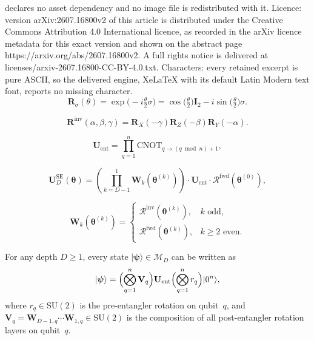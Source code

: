 \documentclass[10pt,a4paper]{amsart}
\newcommand{\CNOT}{\mathrm{CNOT}}
\newcommand{\SU}{\mathrm{SU}}
\newcommand{\cM}{\mathcal{M}}
\begin{document}
declares no asset dependency and no image file is redistributed with it. Licence: version arXiv:2607.16800v2 of this article is distributed under the Creative Commons Attribution 4.0 International licence, as recorded in the arXiv licence metadata for this exact version and shown on the abstract page https://arxiv.org/abs/2607.16800v2. A full rights notice is delivered at licenses/arxiv-2607.16800-CC-BY-4.0.txt. Characters: every retained excerpt is pure ASCII, so the delivered engine, XeLaTeX with its default Latin Modern text font, reports no missing character.
\begin{equation}\label{eq:pauli_rot}
  \mathbf{R}_{\sigma}(\theta)
  = \exp \bigl(-i\tfrac{\theta}{2}\sigma\bigr)
  = \cos \bigl(\tfrac{\theta}{2}\bigr) \mathbf{I}_2
    - i\sin \bigl(\tfrac{\theta}{2}\bigr) \sigma.
\end{equation}

\begin{equation}\label{eq:inv_rot}
  \mathbf{R}^{\mathrm{inv}}(\alpha,\beta,\gamma)
  = \mathbf{R}_X(-\gamma) \mathbf{R}_Z(-\beta) \mathbf{R}_Y(-\alpha).
\end{equation}

\begin{equation}\label{eq:cnot_ring}
  \mathbf{U}_{\mathrm{ent}}
  =\prod_{q=1}^{n}\CNOT_{q\to(q\bmod n)+1},
\end{equation}

\begin{equation}\label{eq:UD}
  \mathbf{U}_D^{\mathrm{SE}}(\bm\theta)
  = \left(\prod_{k=D-1}^{1}\mathbf{W}_k(\bm\theta^{(k)})\right)
    \cdot \mathbf{U}_{\mathrm{ent}}
    \cdot\mathcal{R}^{\mathrm{fwd}}(\bm\theta^{(0)}),
\end{equation}

\begin{equation}\label{eq:Wk}
  \mathbf{W}_k(\bm\theta^{(k)})=
  \begin{cases}
    \mathcal{R}^{\mathrm{inv}}(\bm\theta^{(k)}), & k\text{ odd},\\
    \mathcal{R}^{\mathrm{fwd}}(\bm\theta^{(k)}), & k\ge 2\text{ even}.
  \end{cases}
\end{equation}

\begin{lemma}\label{lem:factor}
  For any depth $D\ge 1$, every state
  $|\boldsymbol{\psi}\rangle\in\cM_D$ can be written as
  \begin{equation}\label{eq:state_form}
    |\boldsymbol{\psi}\rangle
    = \Bigl(\bigotimes_{q=1}^n \mathbf{V}_q\Bigr) 
      \mathbf{U}_{\mathrm{ent}} 
      \Bigl(\bigotimes_{q=1}^n r_q\Bigr)|0^n\rangle,
  \end{equation}
  where $r_q\in\SU(2)$ is the pre-entangler rotation on qubit~$q$, and
  $\mathbf{V}_q = \mathbf{W}_{D{-}1,q}\cdots \mathbf{W}_{1,q}\in\SU(2)$ is the composition of all
  post-entangler rotation layers on qubit~$q$.
\end{lemma}
\end{document}
